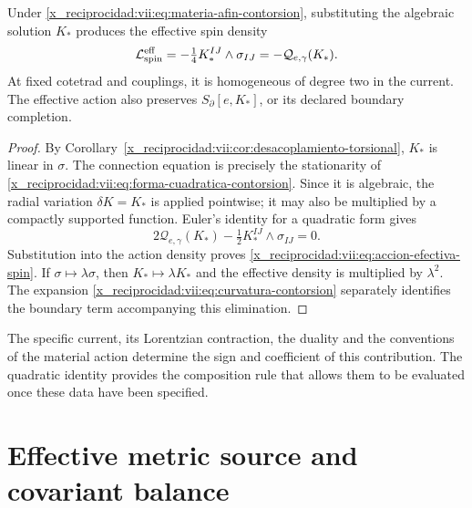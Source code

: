 \begin{HMTCompactSection}
\begin{theorem}
\label{x_reciprocidad:vii:thm:respuesta-cuadratica}
Under \eqref{x_reciprocidad:vii:eq:materia-afin-contorsion}, substituting the algebraic solution \(K_*\) produces the effective spin density
\begin{equation}
 \mathcal L_{\rm spin}^{\rm eff}
 =-\tfrac14 K_*^{IJ}\wedge\sigma_{IJ}
 =-\mathcal Q_{e,\gamma}(K_*).
 \label{x_reciprocidad:vii:eq:accion-efectiva-spin}
\end{equation}
At fixed cotetrad and couplings, it is homogeneous of degree two in the current. The effective action also preserves \(S_\partial[e,K_*]\), or its declared boundary completion.
\end{theorem}
\begin{proof}
By Corollary~\ref{x_reciprocidad:vii:cor:desacoplamiento-torsional}, \(K_*\) is linear in \(\sigma\). The connection equation is precisely the stationarity of \eqref{x_reciprocidad:vii:eq:forma-cuadratica-contorsion}. Since it is algebraic, the radial variation \(\delta K=K_*\) is applied pointwise; it may also be multiplied by a compactly supported function. Euler's identity for a quadratic form gives
\[
 2\mathcal Q_{e,\gamma}(K_*)
             -\tfrac12K_*^{IJ}\wedge\sigma_{IJ}=0.
\]
Substitution into the action density proves \eqref{x_reciprocidad:vii:eq:accion-efectiva-spin}. If \(\sigma\mapsto\lambda\sigma\), then \(K_*\mapsto\lambda K_*\) and the effective density is multiplied by \(\lambda^2\). The expansion \eqref{x_reciprocidad:vii:eq:curvatura-contorsion} separately identifies the boundary term accompanying this elimination.
\end{proof}

The specific current, its Lorentzian contraction, the duality and the conventions of the material action determine the sign and coefficient of this contribution. The quadratic identity provides the composition rule that allows them to be evaluated once these data have been specified.

\section{Effective metric source and covariant balance}
\label{x_reciprocidad:vii:subsec:fuente-metrica-efectiva}


\end{HMTCompactSection}
